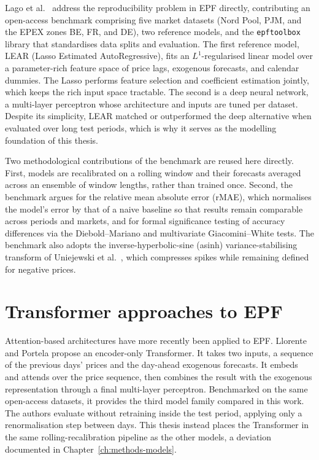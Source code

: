 Lago et al.\ \cite{lago2021} address the reproducibility problem in EPF directly,
contributing an open-access benchmark comprising five market datasets (Nord
Pool, PJM, and the EPEX zones BE, FR, and DE), two reference models, and the
\texttt{epftoolbox} library that standardises data splits and evaluation. The
first reference model, LEAR (Lasso Estimated AutoRegressive), fits an
$L^1$-regularised linear model over a parameter-rich feature space of price lags,
exogenous forecasts, and calendar dummies. The Lasso performs feature selection
and coefficient estimation jointly, which keeps the rich input space tractable.
The second is a deep neural network, a multi-layer perceptron whose
architecture and inputs are tuned per dataset. Despite its simplicity, LEAR
matched or outperformed the deep alternative when evaluated over long test
periods, which is why it serves as the modelling foundation of this thesis.

Two methodological contributions of the benchmark are reused here directly.
First, models are recalibrated on a rolling window and their forecasts averaged
across an ensemble of window lengths, rather than trained once. Second, the
benchmark argues for the relative mean absolute error (rMAE), which normalises
the model's error by that of a naive baseline so that results remain comparable
across periods and markets, and for formal significance testing of accuracy
differences via the Diebold--Mariano \cite{diebold1995dm} and multivariate
Giacomini--White \cite{giacomini2006gw} tests. The benchmark also adopts the
inverse-hyperbolic-sine (asinh) variance-stabilising transform of Uniejewski et
al.\ \cite{uniejewski2018vst}, which compresses spikes while remaining defined
for negative prices.

\section{Transformer approaches to EPF}
\label{sec:bg-transformer}

Attention-based architectures have more recently been applied to EPF. Llorente
and Portela \cite{llorente2025transformer} propose an encoder-only Transformer.
It takes two inputs, a sequence of the previous days' prices and the day-ahead
exogenous forecasts. It embeds and attends over the price sequence, then combines
the result with the exogenous representation through a final multi-layer
perceptron. Benchmarked on the same open-access datasets, it provides the third
model family compared in this work. The authors evaluate without retraining
inside the test period, applying only a renormalisation step between days. This
thesis instead places the Transformer in the same rolling-recalibration pipeline
as the other models, a deviation documented in Chapter~\ref{ch:methods-models}.

